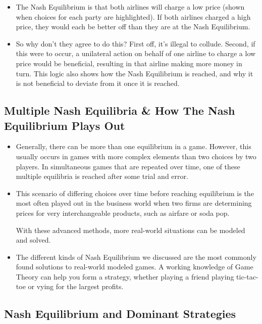 \documentclass[a4paper,12pt]{article}
\begin{document}
\begin{itemize}
	\item The Nash Equilibrium is that both airlines will charge a low price (shown when choices for each party are highlighted). If both airlines charged a high price, they would each be better off than they are at the Nash Equilibrium.
	
\item So why don't they agree to do this? First off, it's illegal to collude. Second, if this were to occur, a unilateral action on behalf of one airline to charge a low price would be beneficial, resulting in that airline making more money in turn. This logic also shows how the Nash Equilibrium is reached, and why it is not beneficial to deviate from it once it is reached. 
\end{itemize}


\subsection{Multiple Nash Equilibria \& How The Nash Equilibrium Plays Out}
\begin{itemize}
\item Generally, there can be more than one equilibrium in a game. However, this usually occurs in games with more complex elements than two choices by two players. In simultaneous games that are repeated over time, one of these multiple equilibria is reached after some trial and error. 
\item This scenario of differing choices over time before reaching equilibrium is the most often played out in the business world when two firms are determining prices for very interchangeable products, such as airfare or soda pop.

With these advanced methods, more real-world situations can be modeled and solved. 
\item The different kinds of Nash Equilibrium we discussed are the most commonly found solutions to real-world modeled games. A working knowledge of Game Theory can help you form a strategy, whether playing a friend playing tic-tac-toe or vying for the largest profits.
\end{itemize}

\newpage


\subsection{Nash Equilibrium and Dominant Strategies}
\end{document}
